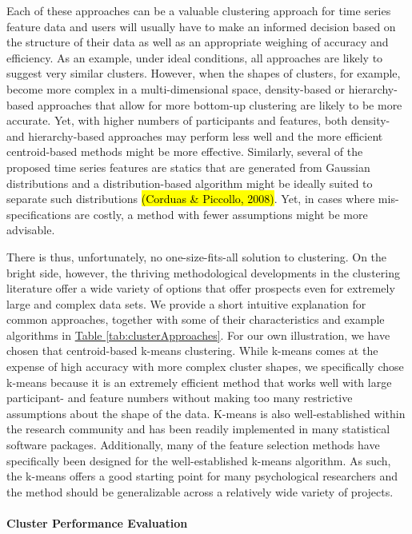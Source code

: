 \documentclass[man, 12pt, a4paper, mask]{apa7}
\theoremstyle{break}
\theoremstyle{plain}
\newcommand{\tblref}[2][]{\hyperref[#2]{Table \ref*{#2}#1}}
\begin{document}
Each of these approaches can be a valuable clustering approach for time series feature data and users will usually have to make an informed decision based on the structure of their data as well as an appropriate weighing of accuracy and efficiency. As an example, under ideal conditions, all approaches are likely to suggest very similar clusters. However, when the shapes of clusters, for example, become more complex in a multi-dimensional space, density-based or hierarchy-based approaches that allow for more bottom-up clustering are likely to be more accurate. Yet, with higher numbers of participants and features, both density- and hierarchy-based approaches may perform less well and the more efficient centroid-based methods might be more effective. Similarly, several of the proposed time series features are statics that are generated from Gaussian distributions and a distribution-based algorithm might be ideally suited to separate such distributions \hl{(Corduas \& Piccollo, 2008)}. Yet, in cases where mis-specifications are costly, a method with fewer assumptions might be more advisable. 

There is thus, unfortunately, no one-size-fits-all solution to clustering. On the bright side, however, the thriving methodological developments in the clustering literature offer a wide variety of options that offer prospects even for extremely large and complex data sets. We provide a short intuitive explanation for common approaches, together with some of their characteristics and example algorithms in \tblref{tab:clusterApproaches}. For our own illustration, we have chosen that centroid-based k-means clustering. While k-means comes at the expense of high accuracy with more complex cluster shapes, we specifically chose k-means because it is an extremely efficient method that works well with large participant- and feature numbers without making too many restrictive assumptions about the shape of the data. K-means is also well-established within the research community and has been readily implemented in many statistical software packages. Additionally, many of the feature selection methods have specifically been designed for the well-established k-means algorithm. As such, the k-means offers a good starting point for many psychological researchers and the method should be generalizable across a relatively wide variety of projects.

\paragraph{Cluster Performance Evaluation}
\end{document}
